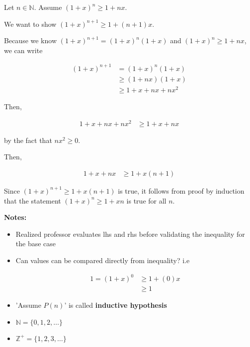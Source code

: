 \documentclass[12pt]{article}
\begin{document}
\begin{enumerate}[a.]
\begin{mdframed}
        Let $n \in \mathbb{N}$. Assume $(1+x)^n \geq 1 + nx$.

        \bigskip

        We want to show $(1+x)^{n+1} \geq 1 + (n+1)x$.

        \bigskip

        Because we know $(1 + x)^{n+1} = (1+x)^n(1+x)$ and $(1+x)^n \geq 1 + nx$, we
        can write

        \begin{align}
            (1+x)^{n+1} &= (1+x)^n(1+x)\\
            &\geq (1+nx)(1+x)\\
            &\geq 1 + x + nx + nx^2
        \end{align}

        \bigskip

        Then,

        \begin{align}
            1 + x + nx + nx^2 &\geq 1 + x + nx
        \end{align}

        by the fact that $nx^2 \geq 0$.

        \bigskip

        Then,

        \begin{align}
            1 + x + nx &\geq 1 + x(n+1)
        \end{align}

        \bigskip

        Since $(1+x)^{n+1} \geq 1 + x(n+1)$ is true, it follows from proof by
        induction that the statement $(1+x)^n \geq 1 + xn$ is true for all $n$.

    \end{mdframed}

    \textbf{Notes:}
    \begin{itemize}
        \item Realized professor evaluates lhs and rhs before validating the inequality for the base case
        \item Can values can be compared directly from inequality? i.e

        \begin{align}
            1 = (1+x)^0 &\geq 1 + (0)x\\
            &\geq 1
        \end{align}

        \item 'Assume $P(n)$' is called \textbf{inductive hypothesis}
        \item $\mathbb{N} = \{0,1,2,\dots\}$
        \item $\mathbb{Z}^{+} = \{1,2,3,\dots\}$
    \end{itemize}

\end{enumerate}
\end{document}
